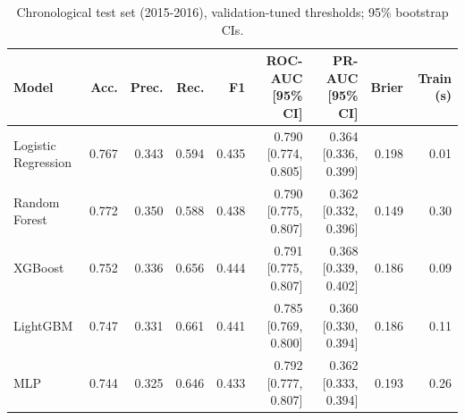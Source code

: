\begin{table}[t]
\centering
\footnotesize
\caption{Chronological test set (2015-2016), validation-tuned thresholds; 95\% bootstrap CIs.}
\label{tab:comparison}
\begin{tabular}{lrrrrrrrr}
\toprule
Model & Acc. & Prec. & Rec. & F1 & ROC-AUC [95\% CI] & PR-AUC [95\% CI] & Brier & Train (s) \\
\midrule
Logistic Regression & 0.767 & 0.343 & 0.594 & 0.435 & 0.790 [0.774, 0.805] & 0.364 [0.336, 0.399] & 0.198 & 0.01 \\
Random Forest & 0.772 & 0.350 & 0.588 & 0.438 & 0.790 [0.775, 0.807] & 0.362 [0.332, 0.396] & 0.149 & 0.30 \\
XGBoost & 0.752 & 0.336 & 0.656 & 0.444 & 0.791 [0.775, 0.807] & 0.368 [0.339, 0.402] & 0.186 & 0.09 \\
LightGBM & 0.747 & 0.331 & 0.661 & 0.441 & 0.785 [0.769, 0.800] & 0.360 [0.330, 0.394] & 0.186 & 0.11 \\
MLP & 0.744 & 0.325 & 0.646 & 0.433 & 0.792 [0.777, 0.807] & 0.362 [0.333, 0.394] & 0.193 & 0.26 \\
\bottomrule
\end{tabular}
\end{table}
